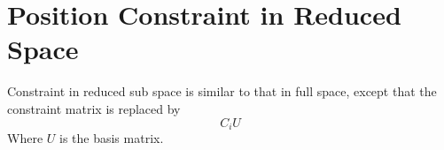 \documentclass[twocolumn]{article}
\begin{document}
\section{Position Constraint in Reduced Space}
Constraint in reduced sub space is similar to that in full space,
except that the constraint matrix is replaced by
\[
C_i  U
\]
Where $U$ is the basis matrix.
\end{document}

